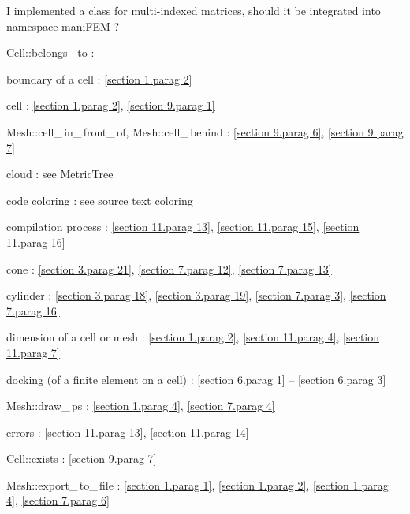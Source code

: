 \documentclass[a4paper]{scrreprt}
\def\numb{}
\newcommand\verm[1]{\textcolor{manif}{#1}}
\renewcommand\tt{\normalfont\ttfamily}
\begin{document}
\noindent I implemented a class for multi-indexed matrices, should it be integrated into
{\small\tt namespace} {\small\tt\verm{maniFEM}} ?





\noindent
{\small\tt\verm{Cell}::belongs\_\,to} : 

\noindent
boundary of a cell : \ref{\numb section 1.\numb parag 2}

\noindent
cell : \ref{\numb section 1.\numb parag 2}, \ref{\numb section 9.\numb parag 1}

\noindent
{\small\tt\verm{Mesh}::cell\_\,in\_\,front\_\,of},
{\small\tt\verm{Mesh}::cell\_\,behind} : \ref{\numb section 9.\numb parag 6},
\ref{\numb section 9.\numb parag 7}

\noindent
cloud : see {\small\tt\verm{MetricTree}}

\noindent
code coloring : see source text coloring


\noindent
compilation process : \ref{\numb section 11.\numb parag 13},
\ref{\numb section 11.\numb parag 15}, \ref{\numb section 11.\numb parag 16}

\noindent
cone : \ref{\numb section 3.\numb parag 21}, \ref{\numb section 7.\numb parag 12},
\ref{\numb section 7.\numb parag 13}

\noindent
cylinder : \ref{\numb section 3.\numb parag 18}, \ref{\numb section 3.\numb parag 19},
\ref{\numb section 7.\numb parag 3}, \ref{\numb section 7.\numb parag 16}

\noindent
dimension of a cell or mesh : \ref{\numb section 1.\numb parag 2},
\ref{\numb section 11.\numb parag 4}, \ref{\numb section 11.\numb parag 7}

\noindent
docking (of a finite element on a cell) :
\ref{\numb section 6.\numb parag 1} -- \ref{\numb section 6.\numb parag 3}

\noindent
{\small\tt\verm{Mesh}::draw\_\,ps} : \ref{\numb section 1.\numb parag 4},
\ref{\numb section 7.\numb parag 4}

\noindent
errors : \ref{\numb section 11.\numb parag 13}, \ref{\numb section 11.\numb parag 14}

\noindent
{\small\tt\verm{Cell}::exists} : \ref{\numb section 9.\numb parag 7}

\noindent
{\small\tt\verm{Mesh}::export\_\,to\_\,file} : \ref{\numb section 1.\numb parag 1},
\ref{\numb section 1.\numb parag 2}, \ref{\numb section 1.\numb parag 4},
\ref{\numb section 7.\numb parag 6}
\end{document}
